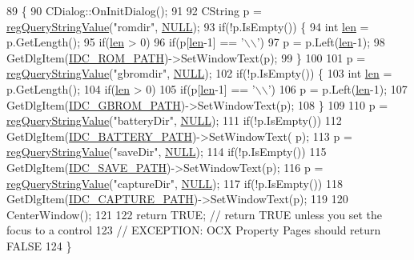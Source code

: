 \begin{DoxyCode}
89 \{
90   CDialog::OnInitDialog();
91   
92   CString p = \mbox{\hyperlink{_reg_8cpp_a618826d274df0d9c19fab2ff28bd9008}{regQueryStringValue}}(\textcolor{stringliteral}{"romdir"}, \mbox{\hyperlink{getopt1_8c_a070d2ce7b6bb7e5c05602aa8c308d0c4}{NULL}});
93   \textcolor{keywordflow}{if}(!p.IsEmpty()) \{
94     \textcolor{keywordtype}{int} \mbox{\hyperlink{expr-lex_8cpp_afed088663f8704004425cdae2120b9b3}{len}} = p.GetLength();
95     \textcolor{keywordflow}{if}(\mbox{\hyperlink{expr-lex_8cpp_afed088663f8704004425cdae2120b9b3}{len}} > 0)
96       \textcolor{keywordflow}{if}(p[\mbox{\hyperlink{expr-lex_8cpp_afed088663f8704004425cdae2120b9b3}{len}}-1] == \textcolor{charliteral}{'\(\backslash\)\(\backslash\)'})
97         p = p.Left(\mbox{\hyperlink{expr-lex_8cpp_afed088663f8704004425cdae2120b9b3}{len}}-1);
98     GetDlgItem(\mbox{\hyperlink{resource_8h_a13b73ee8624e7b7fbc4bfcbf0ee03bc2}{IDC\_ROM\_PATH}})->SetWindowText(p);
99   \}
100   
101   p = \mbox{\hyperlink{_reg_8cpp_a618826d274df0d9c19fab2ff28bd9008}{regQueryStringValue}}(\textcolor{stringliteral}{"gbromdir"}, \mbox{\hyperlink{getopt1_8c_a070d2ce7b6bb7e5c05602aa8c308d0c4}{NULL}});
102   \textcolor{keywordflow}{if}(!p.IsEmpty()) \{
103     \textcolor{keywordtype}{int} \mbox{\hyperlink{expr-lex_8cpp_afed088663f8704004425cdae2120b9b3}{len}} = p.GetLength();
104     \textcolor{keywordflow}{if}(\mbox{\hyperlink{expr-lex_8cpp_afed088663f8704004425cdae2120b9b3}{len}} > 0)
105       \textcolor{keywordflow}{if}(p[\mbox{\hyperlink{expr-lex_8cpp_afed088663f8704004425cdae2120b9b3}{len}}-1] == \textcolor{charliteral}{'\(\backslash\)\(\backslash\)'})
106         p = p.Left(\mbox{\hyperlink{expr-lex_8cpp_afed088663f8704004425cdae2120b9b3}{len}}-1);
107     GetDlgItem(\mbox{\hyperlink{resource_8h_a75cbe88d235eb8171e8786582e10e495}{IDC\_GBROM\_PATH}})->SetWindowText(p);
108   \}
109   
110   p = \mbox{\hyperlink{_reg_8cpp_a618826d274df0d9c19fab2ff28bd9008}{regQueryStringValue}}(\textcolor{stringliteral}{"batteryDir"}, \mbox{\hyperlink{getopt1_8c_a070d2ce7b6bb7e5c05602aa8c308d0c4}{NULL}});
111   \textcolor{keywordflow}{if}(!p.IsEmpty())
112     GetDlgItem(\mbox{\hyperlink{resource_8h_aa25019c65afeea86c240d74f12b3f2e9}{IDC\_BATTERY\_PATH}})->SetWindowText( p);
113   p = \mbox{\hyperlink{_reg_8cpp_a618826d274df0d9c19fab2ff28bd9008}{regQueryStringValue}}(\textcolor{stringliteral}{"saveDir"}, \mbox{\hyperlink{getopt1_8c_a070d2ce7b6bb7e5c05602aa8c308d0c4}{NULL}});
114   \textcolor{keywordflow}{if}(!p.IsEmpty())
115     GetDlgItem(\mbox{\hyperlink{resource_8h_a08017cb452df9076caf00aeef69ba583}{IDC\_SAVE\_PATH}})->SetWindowText(p);
116   p = \mbox{\hyperlink{_reg_8cpp_a618826d274df0d9c19fab2ff28bd9008}{regQueryStringValue}}(\textcolor{stringliteral}{"captureDir"}, \mbox{\hyperlink{getopt1_8c_a070d2ce7b6bb7e5c05602aa8c308d0c4}{NULL}});
117   \textcolor{keywordflow}{if}(!p.IsEmpty())
118     GetDlgItem(\mbox{\hyperlink{resource_8h_afff0b05383dd14a104feefff5424b4b4}{IDC\_CAPTURE\_PATH}})->SetWindowText(p);
119   
120   CenterWindow();
121   
122   \textcolor{keywordflow}{return} TRUE;  \textcolor{comment}{// return TRUE unless you set the focus to a control}
123                 \textcolor{comment}{// EXCEPTION: OCX Property Pages should return FALSE}
124 \}
\end{DoxyCode}
